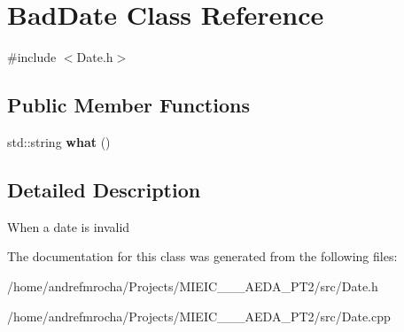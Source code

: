\hypertarget{class_bad_date}{}\section{Bad\+Date Class Reference}
\label{class_bad_date}


{\ttfamily \#include $<$Date.\+h$>$}

\subsection*{Public Member Functions}
\begin{DoxyCompactItemize}
\item 
\mbox{\label{class_bad_date_a50ea387c6301cf0279943fdc5a7db02d}} 
std\+::string {\bfseries what} ()
\end{DoxyCompactItemize}


\subsection{Detailed Description}
When a date is invalid 

The documentation for this class was generated from the following files\+:\begin{DoxyCompactItemize}
\item 
/home/andrefmrocha/\+Projects/\+M\+I\+E\+I\+C\+\_\+\_\+\_\+\+A\+E\+D\+A\+\_\+\+P\+T2/src/Date.\+h\item 
/home/andrefmrocha/\+Projects/\+M\+I\+E\+I\+C\+\_\+\_\+\_\+\+A\+E\+D\+A\+\_\+\+P\+T2/src/Date.\+cpp\end{DoxyCompactItemize}
